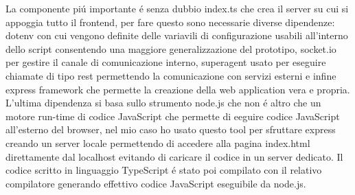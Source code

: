 La componente pi\'u importante \'e senza dubbio index.ts che crea il server su cui si appoggia tutto il frontend, per fare questo sono necessarie diverse dipendenze: dotenv con cui vengono definite delle variavili di configurazione usabili all'interno dello script consentendo una maggiore generalizzazione del prototipo, socket.io per gestire il canale di comunicazione interno, superagent usato per eseguire chiamate di tipo rest permettendo la comunicazione con servizi esterni e infine express framework che permette la creazione della web application vera e propria.
L'ultima dipendenza si basa sullo strumento node.js che non \'e altro che un motore run-time di codice JavaScript che permette di eeguire codice JavaScript all'esterno del browser, nel mio caso ho usato questo tool per sfruttare express creando un server locale permettendo di accedere alla pagina index.html direttamente dal localhost evitando di caricare il codice in un server dedicato.  
Il codice scritto in linguaggio TypeScript \'e stato poi compilato con il relativo compilatore generando effettivo codice JavaScript eseguibile da node.js.


